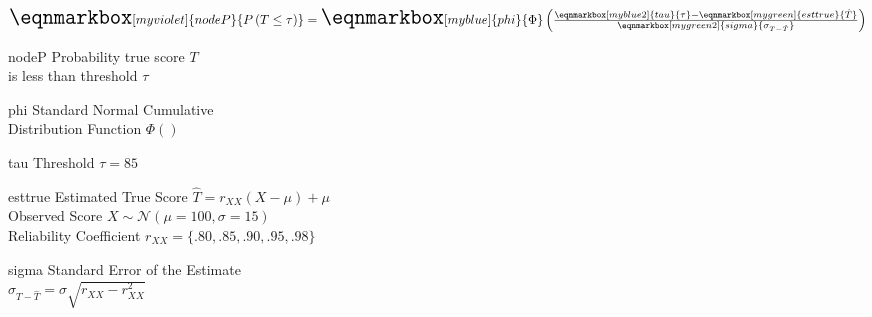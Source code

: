 \documentclass[border={10pt 48pt -45pt 62pt}]{standalone}
\begin{document}
	
\renewcommand{\eqnhighlightheight}{\mathstrut}
	
$\LARGE
\eqnmarkbox[myviolet]{nodeP}{P\left(T \le \tau \right)} = 
\eqnmarkbox[myblue]{phi}{\Phi}
\left(\frac{
	\eqnmarkbox[myblue2]{tau}{\tau}-
	\eqnmarkbox[mygreen]{esttrue}{\hat{T}}}{
	\eqnmarkbox[mygreen2]{sigma}{\sigma_{T - \hat{T}}}}
\right)$


	{nodeP}
	{Probability true score $T$\\ is less than threshold $\tau$ }
	
	{phi}
	{Standard Normal Cumulative\\ Distribution Function $\Phi()$}
	
	{tau}
	{Threshold $\tau=85$}
	
    {esttrue}
    {Estimated True Score $\hat{T}=r_{XX}(X-\mu)+\mu$\\ 
    Observed Score $X\sim \mathcal{N}\left(\mu = 100, \sigma=15\right)$\\ 
    Reliability Coefficient $r_{XX}=\{.80,.85,.90,.95,.98\}$}
	
    {sigma}
    {Standard Error of the Estimate\\ 
    $\sigma_{T-\hat{T}}=\sigma\sqrt{r_{XX}-r_{XX}^2}$}
	
\end{document}
